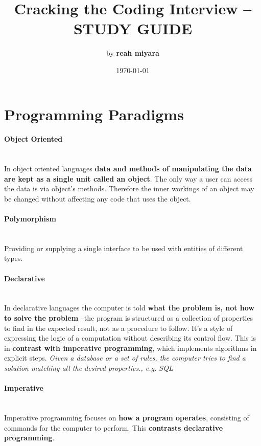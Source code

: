 \documentclass[10pt]{article}
\begin{document}
\setcounter{secnumdepth}{-1}

\title{Cracking the Coding Interview -- STUDY GUIDE}
\author{by {\bf reah miyara} }
\date{\today}
\maketitle

\section{Programming Paradigms}\smallskip
\paragraph{Object Oriented}\ \\
In object oriented languages {\bf data and methods of manipulating the data are kept as a single unit called an object}. The only way a user can access the data is via object's methods. Therefore the inner workings of an object may be changed without affecting any code that uses the object. 
\begin{addmargin}[3em]{2em}%

{\indent \vspace{-10pt} \paragraph{Polymorphism}\ \\
 Providing or supplying a single interface to be used with entities of different types. }
\end{addmargin}

\paragraph{Declarative}\ \\
In declarative languages the computer is told {\bf what the problem is, not how to solve the problem} --the program is structured as a collection of properties to find in the expected result, not as a procedure to follow. It's a style of expressing the logic of a computation without describing its control flow. This is in {\bf contrast with imperative programming}, which implements algorithms in explicit steps. {\it Given a database or a set of rules, the computer tries to find a solution matching all the desired properties., e.g. SQL}

\paragraph{Imperative}\ \\
Imperative programming focuses on {\bf how a program operates}, consisting of commands for the computer to perform. This {\bf contrasts declarative programming}.
\end{document}
